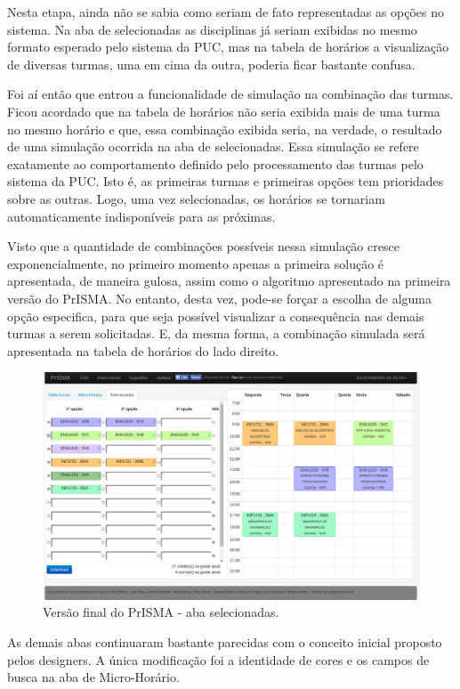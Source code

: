 \documentclass[graduacao,brazil]{ThesisPUC}
\begin{document}
Nesta etapa, ainda não se sabia como seriam de fato representadas as opções no sistema. Na aba de selecionadas as disciplinas já seriam exibidas no mesmo formato esperado pelo sistema da PUC, mas na tabela de horários a visualização de diversas turmas, uma em cima da outra, poderia ficar bastante confusa.

Foi aí então que entrou a funcionalidade de simulação na combinação das turmas. Ficou acordado que na tabela de horários não seria exibida mais de uma turma no mesmo horário e que, essa combinação exibida seria, na verdade, o resultado de uma simulação ocorrida na aba de selecionadas. Essa simulação se refere exatamente ao comportamento definido pelo processamento das turmas pelo sistema da PUC. Isto é, as primeiras turmas e primeiras opções tem prioridades sobre as outras. Logo, uma vez selecionadas, os horários se tornariam automaticamente indisponíveis para as próximas.

Visto que a quantidade de combinações possíveis nessa simulação cresce exponencialmente, no primeiro momento apenas a primeira solução é apresentada, de maneira gulosa, assim como o algoritmo apresentado na primeira versão do PrISMA. No entanto, desta vez, pode-se forçar a escolha de alguma opção especifica, para que seja possível visualizar a consequência nas demais turmas a serem solicitadas. E, da mesma forma, a combinação simulada será apresentada na tabela de horários do lado direito.

\begin{figure}[H]
    \centering
    \includegraphics[width=\linewidth]{img/v3_selecionadas.png}
    \caption{Versão final do PrISMA - aba selecionadas.}
\end{figure}

As demais abas continuaram bastante parecidas com o conceito inicial proposto pelos designers. A única modificação foi a identidade de cores e os campos de busca na aba de Micro-Horário.
\end{document}
